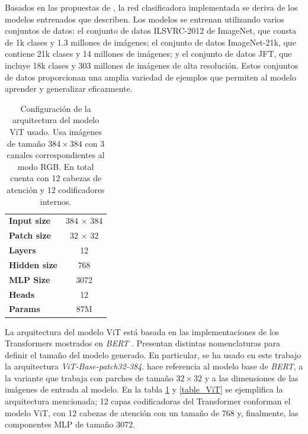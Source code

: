 Basados en las propuestas de \citeauthor{DBLP:journals/corr/abs-2010-11929}, la red clasificadora
implementada se deriva de los modelos entrenados que describen. Los modelos se entrenan utilizando
varios conjuntos de datos: el conjunto de datos ILSVRC-2012 de ImageNet, que consta de 1k clases y
1.3 millones de imágenes; el conjunto de datos ImageNet-21k, que contiene 21k clases y 14 millones
de imágenes; y el conjunto de datos JFT, que incluye 18k clases y 303 millones de imágenes de alta
resolución. Estos conjuntos de datos proporcionan una amplia variedad de ejemplos que permiten al
modelo aprender y generalizar eficazmente.


\begin{table}[!ht]
    \centering
    \begin{tabular}{| l | c |}
     \hline
    \textbf{Input size}  & 384 $\times$ 384 \\
    \textbf{Patch size}  & 32 $\times$ 32 \\
    \textbf{Layers}      & 12  \\
    \textbf{Hidden size} & 768 \\
    \textbf{MLP Size}    & 3072 \\
    \textbf{Heads}       & 12 \\
    \textbf{Params}      & 87M \\
     \hline
    \end{tabular}
    \caption{Configuración de la arquitectura del modelo ViT usado. Usa imágenes de tamaño
             $384 \times 384$ con 3 canales correspondientes al modo RGB. En total cuenta con 12
             cabezas de atención y 12 codificadores internos.}
\label{table_ViTBase}
\end{table}

La arquitectura del modelo ViT está basada en las implementaciones de los Transformers
mostrados en \textit{BERT} \cite{DBLP:journals/corr/abs-1810-04805}. Presentan distintas nomenclaturas
para definir el tamaño del modelo generado. En particular, se ha usado en este trabajo la arquitectura
\textit{ViT-Base-patch32-384}.  hace referencia al modelo base de \textit{BERT},
 a la variante que trabaja con parches de tamaño $32 \times 32$ y  a las
dimensiones de las imágenes de entrada al modelo. En la tabla \ref{table_ViTBase} y \ref{table_ViT}
se ejemplifica la arquitectura mencionada; 12 capas codificadoras del Transformer conforman el modelo
ViT, con 12 cabezas de atención con un tamaño de 768 y, finalmente, las componentes MLP de tamaño 3072.

